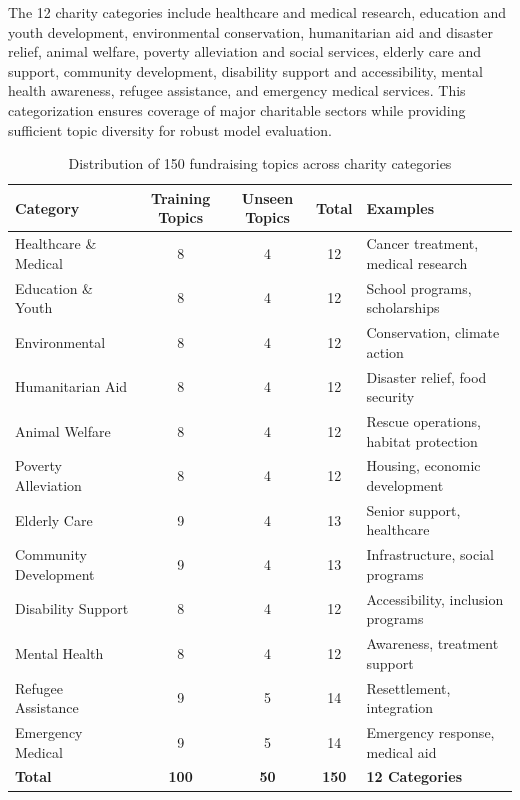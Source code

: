 The 12 charity categories include healthcare and medical research, education and youth development, environmental conservation, humanitarian aid and disaster relief, animal welfare, poverty alleviation and social services, elderly care and support, community development, disability support and accessibility, mental health awareness, refugee assistance, and emergency medical services. This categorization ensures coverage of major charitable sectors while providing sufficient topic diversity for robust model evaluation.

\begin{table}[htbp]
    \centering
    \caption{Distribution of 150 fundraising topics across charity categories}
    \label{tab:topic-distribution}
    \begin{tabular}{|l|c|c|c|l|}
    \hline
    \textbf{Category} & \textbf{Training Topics} & \textbf{Unseen Topics} & \textbf{Total} & \textbf{Examples} \\
    \hline
    Healthcare \& Medical & 8 & 4 & 12 & Cancer treatment, medical research \\
    Education \& Youth & 8 & 4 & 12 & School programs, scholarships \\
    Environmental & 8 & 4 & 12 & Conservation, climate action \\
    Humanitarian Aid & 8 & 4 & 12 & Disaster relief, food security \\
    Animal Welfare & 8 & 4 & 12 & Rescue operations, habitat protection \\
    Poverty Alleviation & 8 & 4 & 12 & Housing, economic development \\
    Elderly Care & 9 & 4 & 13 & Senior support, healthcare \\
    Community Development & 9 & 4 & 13 & Infrastructure, social programs \\
    Disability Support & 8 & 4 & 12 & Accessibility, inclusion programs \\
    Mental Health & 8 & 4 & 12 & Awareness, treatment support \\
    Refugee Assistance & 9 & 5 & 14 & Resettlement, integration \\
    Emergency Medical & 9 & 5 & 14 & Emergency response, medical aid \\
    \hline
    \textbf{Total} & \textbf{100} & \textbf{50} & \textbf{150} & \textbf{12 Categories} \\
    \hline
    \end{tabular}
\end{table}

